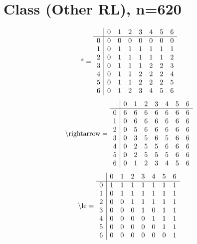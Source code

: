 \documentclass[11pt]{article}
\begin{document}
\section{Class (Other RL), n=620}
\[\text{*} = 
\begin{array}{r | r r r r r r r}
 & 0 & 1 & 2 & 3 & 4 & 5 & 6 \\ \hline
0 & 0 & 0 & 0 & 0 & 0 & 0 & 0 \\
1 & 0 & 1 & 1 & 1 & 1 & 1 & 1 \\
2 & 0 & 1 & 1 & 1 & 1 & 1 & 2 \\
3 & 0 & 1 & 1 & 1 & 2 & 2 & 3 \\
4 & 0 & 1 & 1 & 2 & 2 & 2 & 4 \\
5 & 0 & 1 & 1 & 2 & 2 & 2 & 5 \\
6 & 0 & 1 & 2 & 3 & 4 & 5 & 6 \\
\end{array}
\]
\[\text{\textbackslash rightarrow} = 
\begin{array}{r | r r r r r r r}
 & 0 & 1 & 2 & 3 & 4 & 5 & 6 \\ \hline
0 & 6 & 6 & 6 & 6 & 6 & 6 & 6 \\
1 & 0 & 6 & 6 & 6 & 6 & 6 & 6 \\
2 & 0 & 5 & 6 & 6 & 6 & 6 & 6 \\
3 & 0 & 3 & 5 & 6 & 5 & 6 & 6 \\
4 & 0 & 2 & 5 & 5 & 6 & 6 & 6 \\
5 & 0 & 2 & 5 & 5 & 5 & 6 & 6 \\
6 & 0 & 1 & 2 & 3 & 4 & 5 & 6 \\
\end{array}
\]
\[\text{\textbackslash le} = 
\begin{array}{r | r r r r r r r}
 & 0 & 1 & 2 & 3 & 4 & 5 & 6 \\ \hline
0 & 1 & 1 & 1 & 1 & 1 & 1 & 1 \\
1 & 0 & 1 & 1 & 1 & 1 & 1 & 1 \\
2 & 0 & 0 & 1 & 1 & 1 & 1 & 1 \\
3 & 0 & 0 & 0 & 1 & 0 & 1 & 1 \\
4 & 0 & 0 & 0 & 0 & 1 & 1 & 1 \\
5 & 0 & 0 & 0 & 0 & 0 & 1 & 1 \\
6 & 0 & 0 & 0 & 0 & 0 & 0 & 1 \\
\end{array}
\]
\end{document}
